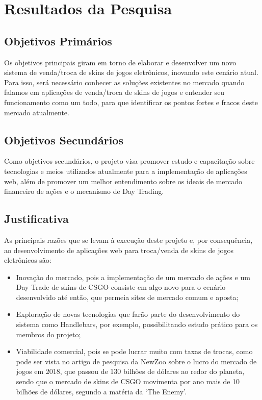 


\chapter{Resultados da Pesquisa}

\section{Objetivos Primários}
Os objetivos principais giram em torno de elaborar e desenvolver um novo sistema de venda/troca de skins de jogos eletrônicos, inovando este cenário atual. Para isso, será necessário conhecer as soluções existentes no mercado quando falamos em aplicações de venda/troca de skins de jogos e entender seu funcionamento como um todo, para que identificar os pontos fortes e fracos deste mercado atualmente.

\section{Objetivos Secundários}
Como objetivos secundários, o projeto visa promover estudo e capacitação sobre tecnologias e meios utilizados atualmente para a implementação de aplicações web, além de promover um melhor entendimento sobre os ideais de mercado financeiro de ações e o mecanismo de Day Trading.

\section{Justificativa}
  As principais razões que se levam à execução deste projeto e, por consequência, ao desenvolvimento de aplicações web para troca/venda de skins de jogos eletrônicos são: 

    \begin{itemize}
        \item Inovação do mercado, pois a implementação de um mercado de ações e um Day Trade de skins de CSGO consiste em algo novo para o cenário desenvolvido até então, que permeia sites de mercado comum e aposta;
        \item Exploração de novas tecnologias que farão parte do desenvolvimento do sistema como Handlebars, por exemplo, possibilitando estudo prático para os membros do projeto;
        \item Viabilidade comercial, pois se pode lucrar muito com taxas de trocas, como pode ser vista no artigo de pesquisa da NewZoo sobre o lucro do mercado de jogos em 2018, que passou de 130 bilhões de dólares ao redor do planeta, sendo que o mercado de skins de CSGO movimenta por ano mais de 10 bilhões de dólares, segundo a matéria da ‘The Enemy’.
      \end{itemize}

